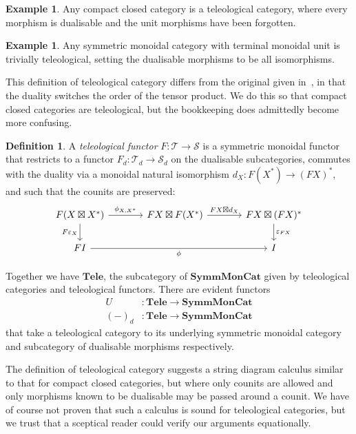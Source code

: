 \documentclass[11pt,letterpaper]{article}
\theoremstyle{plain}
\theoremstyle{definition}
\newtheorem{definition}[theorem]{Definition}
\newtheorem{example}[theorem]{Example}
\newcommand{\T}{\mathscr{T}}
\renewcommand{\S}{\mathscr{S}}
\newcommand{\SymmMonCat}{\mathbf{SymmMonCat}}
\newcommand{\Tele}{\mathbf{Tele}}
\newcommand{\teletimes}{\mathbin{\boxtimes}}
\newcommand{\todo}[1]{\textcolor{red}{\small #1}}
\begin{document}
\begin{example}
  Any compact closed category is a teleological category, where every morphism is dualisable and the unit morphisms have been forgotten.
\end{example}
\begin{example}
  Any symmetric monoidal category with terminal monoidal unit is trivially teleological, setting the dualisable morphisms to be all isomorphisms.
\end{example}

This definition of teleological category differs from the original given in~\cite{CoherenceForLenses}, in that the duality switches the order of the tensor product. We do this so that compact closed categories are teleological, but the bookkeeping does admittedly become more confusing.



\begin{definition}
  A \emph{teleological functor} $F : \T \to \S$ is a symmetric monoidal functor that restricts to a functor $F_d : \T_d \to \S_d$ on the dualisable subcategories, commutes with the duality via a monoidal natural isomorphism $d_X : F(X^*) \to {(FX)}^*$, and such that the counits are preserved:
  \[
   \begin{tikzcd}[column sep = large]
    F(X \teletimes X^*) \ar[r, "\phi_{X, X^*}"]  \ar[d, "F\varepsilon_X", swap] & FX \teletimes F(X^*) \ar[r, "FX \teletimes d_X"] & FX \teletimes (FX)^* \ar[d, "\varepsilon_{FX}"] \\
    FI \ar[rr, "\phi", swap] & & I
  \end{tikzcd}
  \]
\end{definition}

Together we have $\Tele$, the subcategory of $\SymmMonCat$ given by teleological categories and teleological functors. There are evident functors 
\begin{align*}
U &: \Tele \to \SymmMonCat \\
{(-)}_d &: \Tele \to \SymmMonCat 
\end{align*}
that take a teleological category to its underlying symmetric monoidal category and subcategory of dualisable morphisms respectively.

The definition of teleological category suggests a string diagram calculus similar to that for compact closed categories, but where only counits are allowed and only morphisms known to be dualisable may be passed around a counit. We have of course not proven that such a calculus is sound for teleological categories, but we trust that a sceptical reader could verify our arguments equationally.
\end{document}
